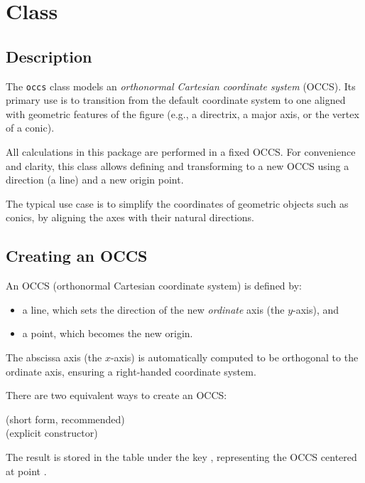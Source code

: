 \newpage
\section{Class }
\label{sec:orthonormal_cartesian_coordinate_system}

\subsection{Description}
The \texttt{occs} class models an \emph{orthonormal Cartesian coordinate system} (OCCS). Its primary use is to transition from the default coordinate system to one aligned with geometric features of the figure (e.g., a directrix, a major axis, or the vertex of a conic).

All calculations in this package are performed in a fixed OCCS. For convenience and clarity, this class allows defining and transforming to a new OCCS using a direction (a line) and a new origin point.

\medskip
\noindent
The typical use case is to simplify the coordinates of geometric objects such as conics, by aligning the axes with their natural directions.

\subsection{Creating an OCCS}\label{occs:create}

An OCCS (orthonormal Cartesian coordinate system) is defined by:
\begin{itemize}
  \item a line, which sets the direction of the new \emph{ordinate} axis (the $y$-axis), and
  \item a point, which becomes the new origin.
\end{itemize}

The abscissa axis (the $x$-axis) is automatically computed to be orthogonal to the ordinate axis, ensuring a right-handed coordinate system.

\medskip
\noindent
There are two equivalent ways to create an OCCS:

\begin{mybox}
   \hfill (short form, recommended)
  \\
   \hfill (explicit constructor)
\end{mybox}

The result is stored in the table  under the key , representing the OCCS centered at point .

